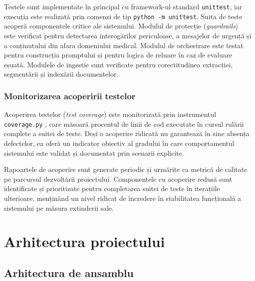 \documentclass[12pt, a4paper, oneside, romanian]{teza-upb}
\begin{document}
Testele sunt implementate în principal cu framework-ul standard \texttt{unittest}, iar execuția este realizată prin comenzi de tip \texttt{python -m unittest}. Suita de teste acoperă componentele critice ale sistemului. Modulul de protecție (\textit{guardrails}) este verificat pentru detectarea interogărilor periculoase, a mesajelor de urgență și a conținutului din afara domeniului medical. Modulul de orchestrare este testat pentru construcția promptului și pentru logica de reluare în caz de evaluare eșuată. Modulele de ingestie sunt verificate pentru corectitudinea extracției, segmentării și indexării documentelor.

\subsection{Monitorizarea acoperirii testelor}

Acoperirea testelor (\textit{test coverage}) este monitorizată prin instrumentul \texttt{coverage.py} \cite{coveragepy_doc}, care măsoară procentul de linii de cod executate în cursul rulării complete a suitei de teste. Deși o acoperire ridicată nu garantează în sine absența defectelor, ea oferă un indicator obiectiv al gradului în care comportamentul sistemului este validat și documentat prin scenarii explicite.

Rapoartele de acoperire sunt generate periodic și urmărite ca metrică de calitate pe parcursul dezvoltării proiectului. Componentele cu acoperire redusă sunt identificate și prioritizate pentru completarea suitei de teste în iterațiile ulterioare, menținând un nivel ridicat de încredere în stabilitatea funcțională a sistemului pe măsura extinderii sale.

\chapter{Arhitectura proiectului}

\section{Arhitectura de ansamblu}
\label{sec:ansamblu}
\end{document}
